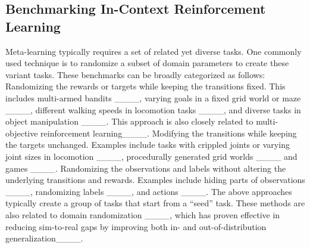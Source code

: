 \subsection{Benchmarking In-Context Reinforcement Learning}
Meta-learning typically requires a set of related yet diverse tasks. One commonly used technique is to randomize a subset of domain parameters to create these variant tasks. These benchmarks can be broadly categorized as follows:
 Randomizing the rewards or targets while keeping the transitions fixed. This includes multi-armed bandits ____, varying goals in a fixed grid world or maze ____, different walking speeds in locomotion tasks ____, and diverse tasks in object manipulation ____. This approach is also closely related to multi-objective reinforcement learning____.
 Modifying the transitions while keeping the targets unchanged. Examples include tasks with crippled joints or varying joint sizes in locomotion ____, procedurally generated grid worlds ____ and games ____.
 Randomizing the observations and labels without altering the underlying transitions and rewards. Examples include hiding parts of observations ____, randomizing labels ____, and actions ____.
The above approaches typically create a group of tasks that start from a ``seed'' task. These methods are also related to domain randomization ____, which has proven effective in reducing sim-to-real gaps by improving both in- and out-of-distribution generalization____.